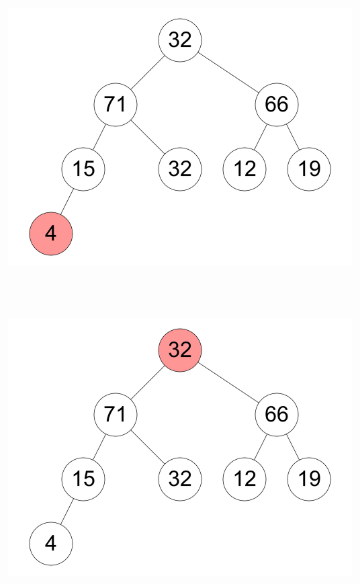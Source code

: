 \documentclass[11pt,a4paper]{article}
\begin{document}
\begin{loesung}
\begin{enumerate}
\begin{figure}[h!]
\begin{subfigure}[b]{0.23\textwidth}
                \includegraphics[width=\textwidth]{img/a8}
            \end{subfigure}
            \\
            \begin{subfigure}[b]{0.23\textwidth}
                \centering
                \includegraphics[width=\textwidth]{img/a9}
            \end{subfigure}
            \begin{subfigure}[b]{0.23\textwidth}
                \centering

\end{subfigure}
\end{figure}
\end{enumerate}
\end{loesung}
\end{document}

